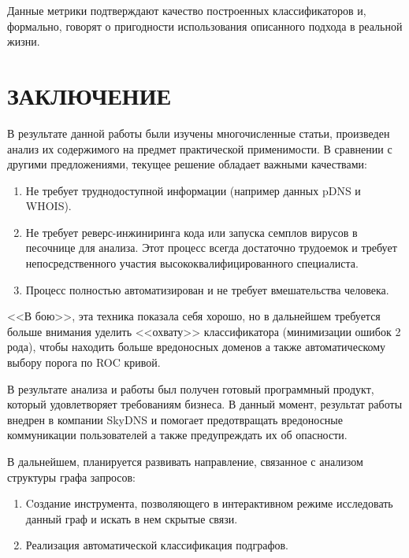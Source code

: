 \documentclass[a4paper,14pt]{extreport} %
\begin{document}
Данные метрики подтверждают качество построенных классификаторов и, формально, говорят о пригодности использования описанного подхода в реальной жизни.

\chapter*{ЗАКЛЮЧЕНИЕ}
В результате данной работы были изучены многочисленные статьи, произведен анализ их содержимого на предмет практической применимости. В сравнении с другими предложениями, текущее решение обладает важными качествами:
\begin{enumerate}
	\item Не требует труднодоступной информации (например данных pDNS и WHOIS).
	\item Не требует реверс-инжиниринга кода или запуска семплов вирусов в песочнице для анализа. Этот процесс всегда достаточно трудоемок и требует непосредственного участия высококвалифицированного специалиста.
	\item Процесс полностью автоматизирован и не требует вмешательства человека.
\end{enumerate}


<<В бою>>, эта техника показала себя хорошо, но в дальнейшем требуется больше внимания уделить <<охвату>> классификатора (минимизации ошибок 2 рода), чтобы находить больше вредоносных доменов а также автоматическому выбору порога по ROC кривой.

В результате анализа и работы был получен готовый программный продукт, который удовлетворяет требованиям бизнеса. В данный момент, результат работы внедрен 	в компании SkyDNS и помогает предотвращать вредоносные коммуникации пользователей а также предупреждать их об опасности.

В дальнейшем, планируется развивать направление, связанное с анализом структуры графа запросов:
\begin{enumerate}
	\item Cоздание инструмента, позволяющего в интерактивном режиме исследовать данный граф и искать в нем скрытые связи.
	\item Реализация автоматической классификация подграфов.
\end{enumerate}
\end{document}
